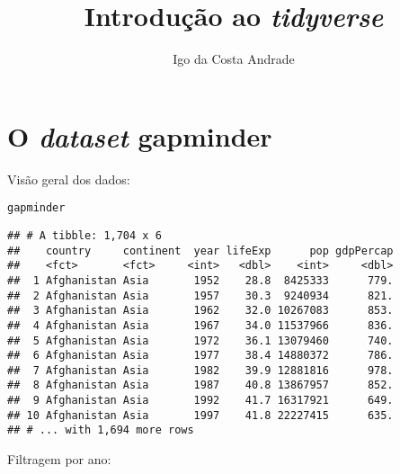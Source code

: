\documentclass{article}\usepackage[]{graphicx}\usepackage[]{xcolor}
\title{Introdução ao \textit{tidyverse}}
\author{Igo da Costa Andrade}
\date{}
\makeatletter
\newcommand{\hlstd}[1]{\textcolor[rgb]{0.345,0.345,0.345}{#1}}%
\newenvironment{kframe}{%
 \def\at@end@of@kframe{}%
 \ifinner\ifhmode%
  \def\at@end@of@kframe{\end{minipage}}%
  \begin{minipage}{\columnwidth}%
 \fi\fi%
 \def\FrameCommand##1{\hskip\@totalleftmargin \hskip-\fboxsep
 \colorbox{shadecolor}{##1}\hskip-\fboxsep
     \hskip-\linewidth \hskip-\@totalleftmargin \hskip\columnwidth}%
 \MakeFramed {\advance\hsize-\width
   \@totalleftmargin\z@ \linewidth\hsize
   \@setminipage}}%
 {\par\unskip\endMakeFramed%
 \at@end@of@kframe}
\newenvironment{knitrout}{}{} %
\makeatother
\begin{document}
\maketitle



\section{O \textit{dataset} gapminder}

Visão geral dos dados:
\begin{knitrout}
\color{fgcolor}\begin{kframe}
\begin{alltt}
\hlstd{gapminder}
\end{alltt}
\begin{verbatim}
## # A tibble: 1,704 x 6
##    country     continent  year lifeExp      pop gdpPercap
##    <fct>       <fct>     <int>   <dbl>    <int>     <dbl>
##  1 Afghanistan Asia       1952    28.8  8425333      779.
##  2 Afghanistan Asia       1957    30.3  9240934      821.
##  3 Afghanistan Asia       1962    32.0 10267083      853.
##  4 Afghanistan Asia       1967    34.0 11537966      836.
##  5 Afghanistan Asia       1972    36.1 13079460      740.
##  6 Afghanistan Asia       1977    38.4 14880372      786.
##  7 Afghanistan Asia       1982    39.9 12881816      978.
##  8 Afghanistan Asia       1987    40.8 13867957      852.
##  9 Afghanistan Asia       1992    41.7 16317921      649.
## 10 Afghanistan Asia       1997    41.8 22227415      635.
## # ... with 1,694 more rows
\end{verbatim}
\end{kframe}
\end{knitrout}

Filtragem por ano:
\end{document}
